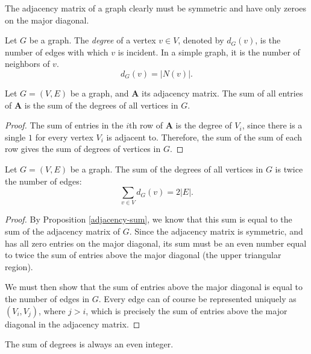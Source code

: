 \documentclass[12pt]{article}
\begin{document}
\begin{rmk}
    The adjacency matrix of a graph clearly must be symmetric and have only zeroes on the major diagonal.
\end{rmk}

\begin{defn}
    Let $G$ be a graph. The \emph{degree} of a vertex $v \in V$, denoted by $d_G(v)$, is the number of edges with which $v$ is incident. In a simple graph, it is the number of neighbors of $v$. \[d_G(v) = |N(v)|.\]
\end{defn}

\begin{prop}\label{adjacency-sum}
    Let $G = (V, E)$ be a graph, and $\bm{A}$ its adjacency matrix. The sum of all entries of $\bm{A}$ is the sum of the degrees of all vertices in $G$.
\end{prop}

\begin{proof}
    The sum of entries in the $i$th row of $\bm{A}$ is the degree of $V_i$, since there is a single $1$ for every vertex $V_i$ is adjacent to. Therefore, the sum of the sum of each row gives the sum of degrees of vertices in $G$.
\end{proof}

\begin{thm}\label{sum-degrees-is-twice-edges}
    Let $G = (V, E)$ be a graph. The sum of the degrees of all vertices in $G$ is twice the number of edges:
    \[\sum_{v\in V}d_G(v) = 2|E|.\]
\end{thm}

\begin{proof}
    By Proposition \ref{adjacency-sum}, we know that this sum is equal to the sum of the adjacency matrix of $G$. Since the adjacency matrix is symmetric, and has all zero entries on the major diagonal, its sum must be an even number equal to twice the sum of entries above the major diagonal (the upper triangular region).

    We must then show that the sum of entries above the major diagonal is equal to the number of edges in $G$. Every edge can of course be represented uniquely as $(V_i, V_j)$, where $j > i$, which is precisely the sum of entries above the major diagonal in the adjacency matrix.
\end{proof}

\begin{cor}\label{sum-degrees-is-even}
    The sum of degrees is always an even integer.
\end{cor}
\end{document}
